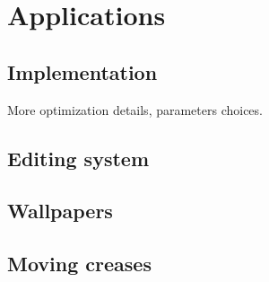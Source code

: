 \section{Applications} \label{sec:app}
\subsection{Implementation}
More optimization details, parameters choices.
\subsection{Editing system}
\subsection{Wallpapers}
\subsection{Moving creases}
